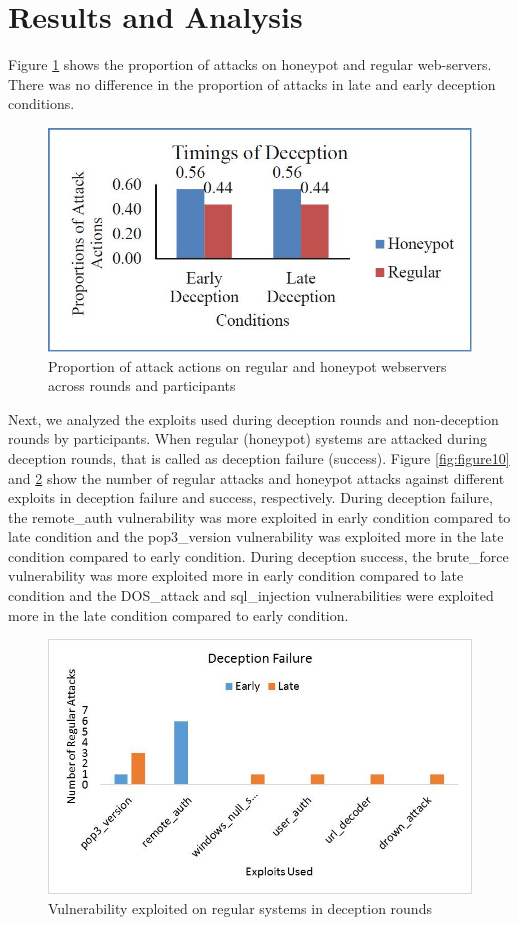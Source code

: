 \section{Results and Analysis}
Figure \ref{fig:figure9} shows the proportion of attacks on honeypot and regular web-servers. There was no difference in the proportion of attacks in late and early deception conditions.
\FloatBarrier
\begin{figure}[!htbp]
\centering
  \includegraphics[scale=0.6]{Chap3/study1_graph.jpg}
  \caption{Proportion of attack actions on regular and honeypot webservers across rounds and participants}\label{fig:figure9}
\end{figure} 
Next, we analyzed the exploits used during deception rounds and non-deception rounds by participants. When regular (honeypot) systems are attacked during deception rounds, that is called as deception failure (success). Figure \ref{fig:figure10} and \ref{fig:figure11} show the number of regular attacks and honeypot attacks against different exploits in deception failure and success, respectively. During deception failure, the remote\_auth vulnerability was more exploited in early condition compared to late condition and the pop3\_version vulnerability was exploited more in the late condition compared to early condition.  During deception success, the brute\_force vulnerability was more exploited more in early condition compared to late condition and the DOS\_attack and sql\_injection vulnerabilities were exploited more in the late condition compared to early condition.
\FloatBarrier
\begin{figure}[!htbp]
\centering
  \includegraphics[scale=0.6]{Chap3/failure.jpg}
  \caption{Vulnerability exploited on regular systems in deception rounds}\label{fig:figure11}
\end{figure} 
